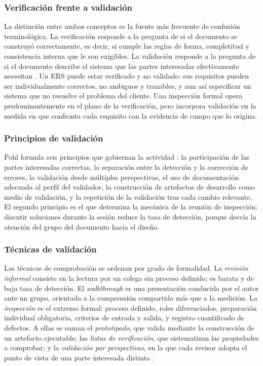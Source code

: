 \documentclass[11pt,letterpaper]{article}
\begin{document}
\subsubsection*{Verificación frente a validación}

La distinción entre ambos conceptos es la fuente más frecuente de confusión terminológica. La
verificación responde a la pregunta de si el documento se construyó correctamente, es decir, si
cumple las reglas de forma, completitud y consistencia interna que le son exigibles. La validación
responde a la pregunta de si el documento describe el sistema que las partes interesadas
efectivamente necesitan \cite{pohl2025}. Un ERS puede estar verificado y no validado: sus requisitos
pueden ser individualmente correctos, no ambiguos y trazables, y aun así especificar un sistema que
no resuelve el problema del cliente. Una inspección formal opera predominantemente en el plano de la
verificación, pero incorpora validación en la medida en que confronta cada requisito con la
evidencia de campo que lo origina.

\subsubsection*{Principios de validación}

Pohl formula seis principios que gobiernan la actividad \cite{pohl2025}: la participación de las
partes interesadas correctas, la separación entre la detección y la corrección de errores, la
validación desde múltiples perspectivas, el uso de documentación adecuada al perfil del validador,
la construcción de artefactos de desarrollo como medio de validación, y la repetición de la
validación tras cada cambio relevante. El segundo principio es el que determina la mecánica de la
reunión de inspección: discutir soluciones durante la sesión reduce la tasa de detección, porque
desvía la atención del grupo del documento hacia el diseño.

\subsubsection*{Técnicas de validación}

Las técnicas de comprobación se ordenan por grado de formalidad. La \emph{revisión informal} consiste
en la lectura por un colega sin proceso definido; es barata y de baja tasa de detección. El
\emph{walkthrough} es una presentación conducida por el autor ante un grupo, orientada a la
comprensión compartida más que a la medición. La \emph{inspección} es el extremo formal: proceso
definido, roles diferenciados, preparación individual obligatoria, criterios de entrada y salida, y
registro cuantificado de defectos. A ellas se suman el \emph{prototipado}, que valida mediante la
construcción de un artefacto ejecutable; las \emph{listas de verificación}, que sistematizan las
propiedades a comprobar; y la \emph{validación por perspectivas}, en la que cada revisor adopta el
punto de vista de una parte interesada distinta \cite{pohl2025, swebok4}.
\end{document}
